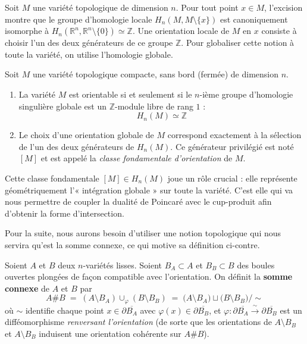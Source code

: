 Soit $M$ une variété topologique de dimension $n$. Pour tout point $x \in M$, l'excision montre que le groupe d'homologie locale $H_n(M, M \setminus \{x\})$ est canoniquement isomorphe à $H_n(\mathbb{R}^n, \mathbb{R}^n \setminus \{0\}) \simeq \mathbb{Z}$. Une orientation locale de $M$ en $x$ consiste à choisir l'un des deux générateurs de ce groupe $\mathbb{Z}$. Pour globaliser cette notion à toute la variété, on utilise l'homologie globale.

\begin{theorem}
Soit $M$ une variété topologique compacte, sans bord (fermée) de dimension $n$.
\begin{enumerate}
    \item La variété $M$ est orientable si et seulement si le $n$-ième groupe d'homologie singulière globale est un $\mathbb{Z}$-module libre de rang $1$ :
    \[
    H_n(M) \simeq \mathbb{Z}
    \]
    \item Le choix d'une orientation globale de $M$ correspond exactement à la sélection de l'un des deux générateurs de $H_n(M)$. Ce générateur privilégié est noté $[M]$ et est appelé la \emph{classe fondamentale d'orientation} de $M$.
\end{enumerate}
\end{theorem}

Cette classe fondamentale $[M] \in H_n(M)$ joue un rôle crucial : elle représente géométriquement l'« intégration globale » sur toute la variété. C'est elle qui va nous permettre de coupler la dualité de Poincaré avec le cup-produit afin d'obtenir la forme d'intersection.
\newpage

Pour la suite, nous aurons besoin d'utiliser une notion topologique qui nous servira qu'est la somme connexe, ce qui motive sa définition ci-contre.

\begin{definition}
Soient $A$ et $B$ deux $n$-variétés lisses. Soient $B_A \subset A$ et $B_B \subset B$ des boules ouvertes plongées de façon compatible avec l'orientation. On définit la \textbf{somme connexe} de $A$ et $B$ par
\[
A \# B \;=\;  (A \setminus B_A) \cup_{\varphi} (B \setminus B_B) \;=\; \bigl(A \setminus B_A\bigr) \sqcup \bigl(B \setminus B_B\bigr) \big/ \sim
\]
où $\sim$ identifie chaque point $x \in \partial \overline{B_A}$ avec $\varphi(x) \in \partial \overline{B_B}$, et $\varphi : \partial \overline{B_A} \xrightarrow{\;\sim\;} \partial \overline{B_B}$ est un difféomorphisme \emph{renversant l'orientation} (de sorte que les orientations de $A\setminus B_B$ et $A \setminus B_B$ induisent une orientation cohérente sur $A\#B$).
\end{definition}


